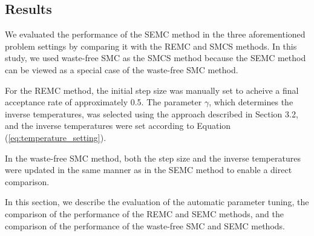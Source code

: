 \documentclass[12pt]{article}
\begin{document}
\subsection{Results}
We evaluated the performance of the SEMC method in the three aforementioned problem settings by comparing it with the REMC and SMCS methods.
In this study, we used waste-free SMC as the SMCS method because the SEMC method can be viewed as a special case of the waste-free SMC method. \par
For the REMC method, the initial step size was manually set to acheive a final acceptance rate of approximately 0.5.
The parameter $\gamma$, which determines the inverse temperatures, was selected using the approach described in Section 3.2, and the inverse temperatures were set according to Equation (\ref{eq:temperature_setting}). \par
In the waste-free SMC method, both the step size and the inverse temperatures were updated in the same manner as in the SEMC method to enable a direct comparison. \par
In this section, we describe the evaluation of the automatic parameter tuning, the comparison of the performance of the REMC and SEMC methods, and the comparison of the performance of the waste-free SMC and SEMC methods. \par
\end{document}

